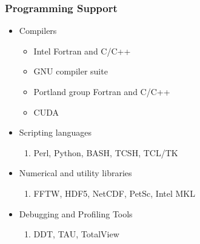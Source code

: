 \documentclass[slidestop,mathserif,compress,xcolor=svgnames,table]{beamer}
\newcommand*\vardiamond{\textcolor{tigerspurple}{%
  \ensuremath{\blacklozenge}}}
\begin{document}
\begin{frame}[c]
  \frametitle{\small Programming Support}
  \begin{itemize}
    \item Compilers
    \begin{itemize}
      \item[$\vardiamond$] Intel Fortran and C/C++
      \item[$\vardiamond$] GNU compiler suite
      \item[$\vardiamond$] Portland group Fortran and C/C++
      \item[$\vardiamond$] CUDA 
    \end{itemize}
    \item Scripting languages
      \begin{enumerate}
        \item[$\vardiamond$] Perl, Python, BASH, TCSH, TCL/TK
      \end{enumerate}
    \item Numerical and utility libraries
      \begin{enumerate}
        \item[$\vardiamond$] FFTW, HDF5, NetCDF, PetSc, Intel MKL
      \end{enumerate}
    \item Debugging and Profiling Tools
      \begin{enumerate}
        \item[$\vardiamond$] DDT, TAU, TotalView
      \end{enumerate}
  \end{itemize}
\end{frame}
\end{document}
